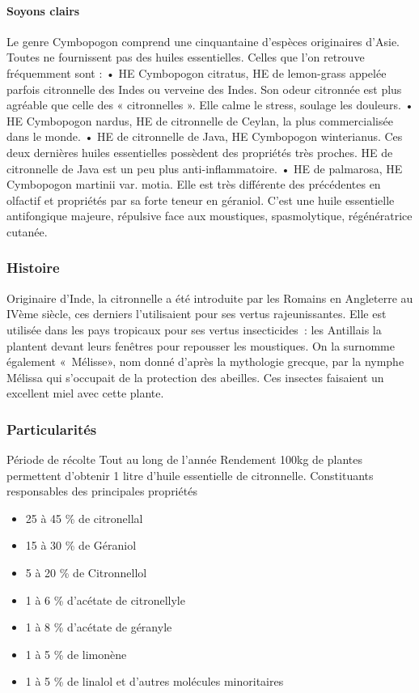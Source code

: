 \documentclass[12pt,a4wide]{article}
\begin{document}
\paragraph{Soyons clairs}
\label{sec-4-5-3-3}
Le genre Cymbopogon comprend une cinquantaine d'espèces originaires d'Asie.
Toutes ne fournissent pas des huiles essentielles. Celles que l'on retrouve fréquemment sont :
    • HE Cymbopogon citratus, HE de lemon-grass appelée parfois citronnelle des Indes ou verveine des Indes. Son odeur citronnée est plus agréable que celle des « citronnelles ». Elle calme le stress, soulage les douleurs.
    • HE Cymbopogon nardus, HE de citronnelle de Ceylan, la plus commercialisée dans le monde.
    • HE de citronnelle de Java, HE Cymbopogon winterianus.
Ces deux dernières huiles essentielles possèdent des propriétés très proches. HE de citronnelle de Java est un peu plus anti-inflammatoire.
    • HE de palmarosa, HE Cymbopogon martinii var. motia. Elle est très différente des précédentes en olfactif et propriétés par sa forte teneur en géraniol. C'est une huile essentielle antifongique majeure, répulsive face aux moustiques, spasmolytique, régénératrice cutanée.

\subsubsection{Histoire}
\label{sec-4-5-4}
Originaire d'Inde, la citronnelle a été introduite par les Romains en Angleterre au IVème siècle, ces derniers l'utilisaient pour ses vertus rajeunissantes.
Elle est utilisée dans les pays tropicaux pour ses vertus insecticides : les Antillais la plantent devant leurs fenêtres pour repousser les moustiques. On la surnomme également « Mélisse», nom donné d'après la mythologie grecque, par la nymphe Mélissa qui s'occupait de la protection des abeilles. Ces insectes faisaient un excellent miel avec cette plante.

\subsubsection{Particularités}
\label{sec-4-5-5}
Période de récolte
Tout au long de l'année
Rendement
100kg de plantes permettent d'obtenir 1 litre d'huile essentielle de citronnelle.
Constituants responsables des principales propriétés
\begin{itemize}
\item 25 à 45 \% de citronellal
\item 15 à 30 \% de Géraniol
\item 5 à 20 \% de Citronnellol
\item 1 à 6 \% d'acétate de citronellyle
\item 1 à 8 \% d'acétate de géranyle
\item 1 à 5 \% de limonène
\item 1 à 5 \% de linalol  et d'autres molécules minoritaires
\end{itemize}
\end{document}
